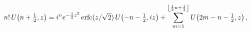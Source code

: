 \[n!\mathop{U\/}\nolimits\!\left(n+\tfrac{1}{2},z\right)=i^{n}e^{-\frac{1}{2}z^{%
2}}\mathop{\mathrm{erfc}\/}\nolimits(z/\sqrt{2})\mathop{U\/}\nolimits\!\left(-%
n-\tfrac{1}{2},iz\right)+\sum_{m=1}^{\left\lfloor\frac{1}{2}n+\frac{1}{2}%
\right\rfloor}\mathop{U\/}\nolimits\!\left(2m-n-\tfrac{1}{2},z\right),\]